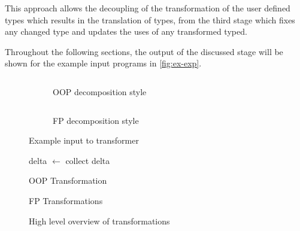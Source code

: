 \documentclass[ oneside,%
                    author={James Elgar},
                    degree={MEng},
                     title={Bidirectional transformer between functional and \\ object-oriented programming in Rust},
                  subtitle={}]{dissertation}
\newcommand{\codefileLN}[4]{\inputminted[xleftmargin=20pt,linenos, breaklines, firstline=#3, lastline=#4]{#1}{#2}}
\newcommand{\rustfileLN}[3]{\codefileLN{rust}{../#1.rs}{#2}{#3}}
\newcommand{\rustexampleLN}[3]{\rustfileLN{examples/src/#1}{#2}{#3}}
\begin{document}
This approach allows the decoupling of the transformation of the user defined types which results in the translation of types, from the third stage which fixes any changed type and updates the uses of any transformed typed. 

Throughout the following sections, the output of the discussed stage will be shown for the example input programs in \autoref{fig:ex-exp}.

\begin{figure}
\centering
\begin{subfigure}{.5\textwidth}
    \rustexampleLN{exp/oop}{1}{22}
    \caption{OOP decomposition style}
    \label{fig:dec-ex-oop}
\end{subfigure}%
\begin{subfigure}{.5\textwidth}
    \rustexampleLN{exp/fp}{1}{11}
    \caption{FP decomposition style}
    \label{fig:dec-ex-fp}
\end{subfigure}
\caption{Example input to transformer}
\label{fig:ex-exp}
\end{figure}

\begin{figure}
\begin{minipage}{0.46\textwidth}
    \begin{algorithm}[H]
    delta $\leftarrow$ collect delta \\
    \caption{OOP Transformation}
    \label{alg:high-level-oop}
    \end{algorithm}
\end{minipage}
\hfill
\begin{minipage}{0.46\textwidth}
    \begin{algorithm}[H]
    \caption{FP Transformations}
    \label{alg:high-level-fp}
    \end{algorithm}
\end{minipage}
\caption{High level overview of transformations}
\label{alg:high-level}
\end{figure}
\end{document}
